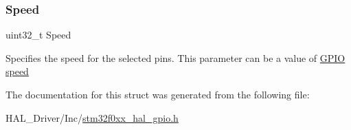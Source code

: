\subsubsection{\texorpdfstring{Speed}{Speed}}
{\footnotesize\ttfamily uint32\+\_\+t Speed}

Specifies the speed for the selected pins. This parameter can be a value of \hyperlink{group___g_p_i_o__speed}{G\+P\+IO speed} 

The documentation for this struct was generated from the following file\+:\begin{DoxyCompactItemize}
\item 
H\+A\+L\+\_\+\+Driver/\+Inc/\hyperlink{stm32f0xx__hal__gpio_8h}{stm32f0xx\+\_\+hal\+\_\+gpio.\+h}\end{DoxyCompactItemize}

